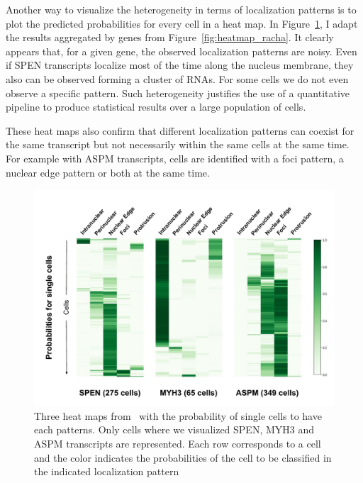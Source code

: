 Another way to visualize the heterogeneity in terms of localization patterns is to plot the predicted probabilities for every cell in a heat map.
In Figure~\ref{fig:heatmap_racha_cells}, I adapt the results aggregated by genes from Figure~\ref{fig:heatmap_racha}.
It clearly appears that, for a given gene, the observed localization patterns are noisy.
Even if SPEN transcripts localize most of the time along the nucleus membrane, they also can be observed forming a cluster of \ac{RNA}s.
For some cells we do not even observe a specific pattern.
Such heterogeneity justifies the use of a quantitative pipeline to produce statistical results over a large population of cells.

These heat maps also confirm that different localization patterns can coexist for the same transcript but not necessarily within the same cells at the same time.
For example with ASPM transcripts, cells are identified with a foci pattern, a nuclear edge pattern or both at the same time.

\begin{figure}[h]
    \centering
    \includegraphics[width=\textwidth]{figures/appendix/heatmap_cell_racha}
    \caption[Heat maps with cell-wise classification results]{Three heat maps from~\cite{CHOUAIB_2020} with the probability of single cells to have each patterns.
	Only cells where we visualized SPEN, MYH3 and ASPM transcripts are represented.
	Each row corresponds to a cell and the color indicates the probabilities of the cell to be classified in the indicated localization pattern}
    \label{fig:heatmap_racha_cells}
\end{figure}
